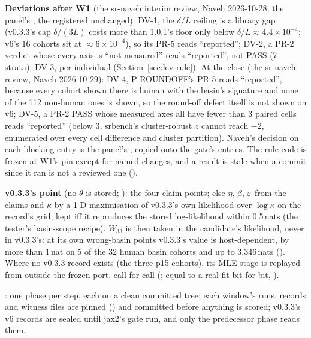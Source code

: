 \textbf{Deviations after W1} (the sr-naveh interim review, Naveh 2026-10-28; the panel's \code{[deviations]}, the
registered \code{[rules]} unchanged): DV-1, the $\delta/L$ ceiling is a library gap (v0.3.3's cap $\delta/(3L)$ costs
more than 1.0.1's floor only below $\delta/L\approx4.4\times10^{-4}$; v6's 16 cohorts sit at $\approx6\times10^{-4}$), so
its PR-5 reads ``reported''; DV-2, a PR-2 verdict whose every axis is ``not measured'' reads ``reported'', not PASS (7
strata); DV-3,  per individual (Section~\ref{sec:lev-rule}). At the close (the sr-naveh review,
Naveh 2026-10-29): DV-4, P-ROUNDOFF's PR-5 reads ``reported'', because every cohort shown there is human with the basin's
signature and none of the 112 non-human ones is shown, so the round-off defect itself is not shown on v6; DV-5, a PR-2
PASS whose measured axes all have fewer than 3 paired cells reads ``reported'' (below 3, srbench's cluster-robust $z$
cannot reach $-2$, enumerated over every cell difference and cluster partition). Naveh's decision on each blocking
entry is the panel's \code{[[decisions]]}, copied onto the gate's entries. The rule code is frozen at W1's pin
except for named changes, and a result is stale when a commit since it ran is not a reviewed one
().

\textbf{v0.3.3's point} (no $\theta$ is stored; ): the four claim points; else $\eta$,
$\beta$, $\varepsilon$ from the claims and $\kappa$ by a 1-D maximisation of v0.3.3's own likelihood over $\log\kappa$ on the
record's grid, kept iff it reproduces the stored log-likelihood within 0.5\,nats (the tester's basin-scope recipe).
$W_{33}$ is then taken in the candidate's likelihood, never in v0.3.3's: at its own wrong-basin points v0.3.3's value
is host-dependent, by more than 1\,nat on 5 of the 32 human basin cohorts and up to 3,346\,nats
(). Where no v0.3.3 record exists (the three p15 cohorts), its
MLE stage is replayed from outside the frozen port, call for call (; equal to a real fit bit
for bit, ).

\tplImpl
{}: one phase per step, each on a clean committed tree; each window's runs, records and
witness files are pinned () and committed before anything is scored; v0.3.3's v6
records are sealed until jax2's gate run, and only the predecessor phase reads them.

